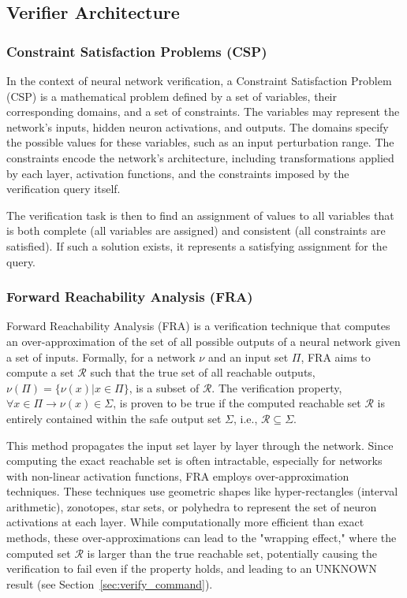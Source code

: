 \subsection{Verifier Architecture}\label{sec:arch}

\subsubsection*{Constraint Satisfaction Problems (CSP)}\label{sec:csp}
In the context of neural network verification, a Constraint Satisfaction Problem (CSP) is a mathematical problem 
defined by a set of variables, their corresponding domains, and a set of constraints. The variables may represent
the network's inputs, hidden neuron activations, and outputs. The domains specify the possible values for these 
variables, such as an input perturbation range. The constraints encode the network's architecture, including 
transformations applied by each layer, activation functions, and the constraints imposed by the verification query itself.

The verification task is then to find an assignment of values to all variables that is both complete 
(all variables are assigned) and consistent (all constraints are satisfied). If such a solution exists, 
it represents a satisfying assignment for the query. 

\subsubsection*{Forward Reachability Analysis (FRA)}\label{sec:fra}
Forward Reachability Analysis (FRA) is a verification technique that computes an over-approximation 
of the set of all possible outputs of a neural network given a set of inputs. Formally, for a network $\nu$ 
and an input set $\Pi$, FRA aims to compute a set $\mathcal{R}$ such that the true set of all reachable outputs, 
$\nu(\Pi) = \{\nu(x) | x \in \Pi\}$, is a subset of $\mathcal{R}$. The verification property, 
$\forall x \in \Pi \rightarrow \nu(x) \in \Sigma$, is proven to be true if the computed reachable set $\mathcal{R}$ 
is entirely contained within the safe output set $\Sigma$, i.e., $\mathcal{R} \subseteq \Sigma$.

This method propagates the input set layer by layer through the network. Since computing the exact reachable set is often 
intractable, especially for networks with non-linear activation functions, FRA employs over-approximation techniques. 
These techniques use geometric shapes like hyper-rectangles (interval arithmetic), zonotopes, star sets, or polyhedra to represent 
the set of neuron activations at each layer. While computationally more efficient than exact methods, these over-approximations 
can lead to the "wrapping effect," where the computed set $\mathcal{R}$ is larger than the true reachable set, potentially causing 
the verification to fail even if the property holds, and leading to an UNKNOWN result (see Section~\ref{sec:verify_command}).

